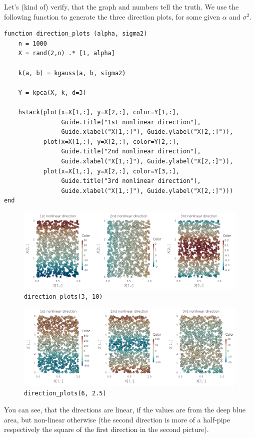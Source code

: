 \documentclass[10pt,a4paper]{article}
\begin{document}
Let's (kind of) verify, that the graph and numbers tell the truth. We use the
following function to generate the three direction plots, for some given
$\alpha$ and $\sigma^{2}$.
\begin{verbatim}
function direction_plots (alpha, sigma2)
    n = 1000
    X = rand(2,n) .* [1, alpha]

    k(a, b) = kgauss(a, b, sigma2)

    Y = kpca(X, k, d=3)

    hstack(plot(x=X[1,:], y=X[2,:], color=Y[1,:],
                Guide.title("1st nonlinear direction"),
                Guide.xlabel("X[1,:]"), Guide.ylabel("X[2,:]")),
           plot(x=X[1,:], y=X[2,:], color=Y[2,:],
                Guide.title("2nd nonlinear direction"),
                Guide.xlabel("X[1,:]"), Guide.ylabel("X[2,:]")),
           plot(x=X[1,:], y=X[2,:], color=Y[3,:],
                Guide.title("3rd nonlinear direction"),
                Guide.xlabel("X[1,:]"), Guide.ylabel("X[2,:]")))
end
\end{verbatim}
\begin{figure}[ht!]
  \centering
  \includegraphics[width=350pt]{7_2_c_linear}
  \caption{\texttt{direction_plots(3, 10)}}
\end{figure}
\begin{figure}[ht!]
  \centering
  \includegraphics[width=350pt]{7_2_c_nonlinear}
  \caption{\texttt{direction_plots(6, 2.5)}}
\end{figure}
You can see, that the directions are linear, if the values are from the deep
blue area, but non-linear otherwise (the second direction is more of a half-pipe
respectively the square of the first direction in the second picture).
\end{document}
